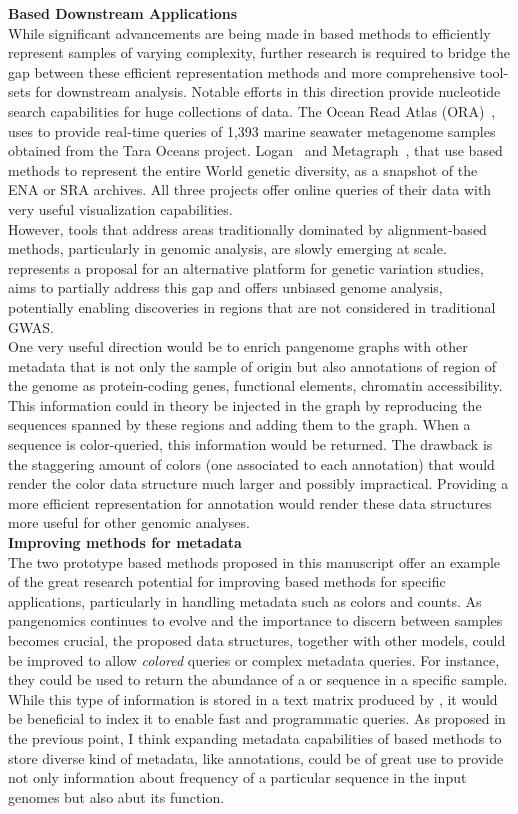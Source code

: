 \textbf{\kmer Based Downstream Applications}\\
While significant advancements are being made in \kmer based methods to efficiently represent samples of varying complexity, further research is required to bridge the gap between these efficient representation methods and more comprehensive tool-sets for downstream analysis.
Notable efforts in this direction provide nucleotide search capabilities for huge collections of data. The Ocean Read Atlas (ORA)~\cite{ora}, uses \kmt to provide real-time queries of 1,393 marine seawater metagenome samples obtained from the Tara Oceans project. Logan~\cite{logan} and Metagraph~\cite{metagraph}, that use \kmer based methods to represent the entire World genetic diversity, as a snapshot of the ENA or SRA archives. All three projects offer online queries of their data with very useful visualization capabilities.\\
However, tools that address areas traditionally dominated by alignment-based methods, particularly in genomic analysis, are slowly emerging at scale. \muset represents a proposal for an alternative platform for genetic variation studies, aims to partially address this gap and offers unbiased genome analysis, potentially enabling discoveries in regions that are not considered in traditional GWAS.\\ One very useful direction would be to enrich pangenome graphs with other metadata that is not only the sample of origin but also annotations of region of the genome as protein-coding genes, functional elements, chromatin accessibility. This information could in theory be injected in the graph by reproducing the sequences spanned by these regions and adding them to the graph. When a sequence is color-queried, this information would be returned. The drawback is the staggering amount of colors (one associated to each annotation) that would render the color data structure much larger and possibly impractical. Providing a more efficient representation for annotation would render these data structures more useful for other genomic analyses.\\
\textbf{Improving methods for metadata}\\
The two prototype \kmer based methods proposed in this manuscript offer an example of the great research potential for improving \kmer based methods for specific applications, particularly in handling metadata such as colors and counts.
As pangenomics continues to evolve and the importance to discern between samples becomes crucial, the proposed data structures, together with other models, could be improved to allow \emph{colored} queries or complex metadata queries. For instance, they could be used to return the abundance of a \kmer or sequence in a specific sample. While this type of information is stored in a text matrix produced by \muset, it would be beneficial to index it to enable fast and programmatic queries. As proposed in the previous point, I think expanding metadata capabilities of \kmer based methods to store diverse kind of metadata, like annotations, could be of great use to provide not only information about frequency of a particular sequence in the input genomes but also abut its function.